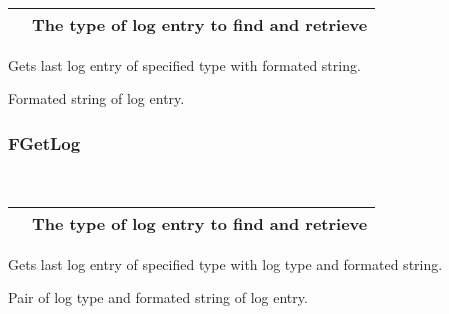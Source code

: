 \documentclass[letterpaper,10pt,english]{sphinxmanual}
\begin{document}
\begin{fulllineitems}
\label{\detokenize{log:_CPPv2N6pessum6GetLogEi}}%
\pysigstartmultiline
{}%
\pysigstopmultiline~

\begin{savenotes}\sphinxattablestart
\centering
\begin{tabulary}{\linewidth}[t]{|T|T|}
\hline

&
The type of log entry to find and retrieve
\\
\hline
\end{tabulary}
\par
\sphinxattableend\end{savenotes}

Gets last log entry of specified type with formated string.

 Formated string of log entry.

\end{fulllineitems}



\subsubsection{FGetLog}
\label{\detokenize{log:fgetlog}}

\begin{fulllineitems}
\label{\detokenize{log:_CPPv2N6pessum7FGetLogEi}}%
\pysigstartmultiline
{}%
\pysigstopmultiline~

\begin{savenotes}\sphinxattablestart
\centering
\begin{tabulary}{\linewidth}[t]{|T|T|}
\hline

&
The type of log entry to find and retrieve
\\
\hline
\end{tabulary}
\par
\sphinxattableend\end{savenotes}

Gets last log entry of specified type with log type and formated string.

 Pair of log type and formated string of log entry.

\end{fulllineitems}
\end{document}
